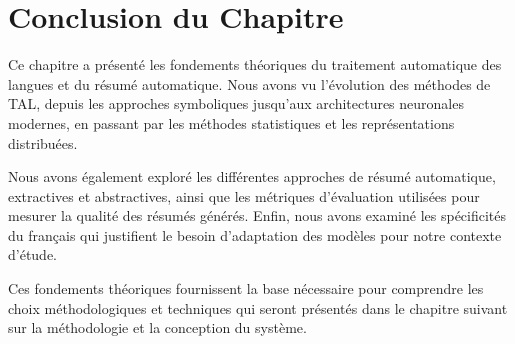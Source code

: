
\section{Conclusion du Chapitre}

Ce chapitre a présenté les fondements théoriques du traitement automatique des langues et du résumé automatique. Nous avons vu l'évolution des méthodes de TAL, depuis les approches symboliques jusqu'aux architectures neuronales modernes, en passant par les méthodes statistiques et les représentations distribuées.

Nous avons également exploré les différentes approches de résumé automatique, extractives et abstractives, ainsi que les métriques d'évaluation utilisées pour mesurer la qualité des résumés générés. Enfin, nous avons examiné les spécificités du français qui justifient le besoin d'adaptation des modèles pour notre contexte d'étude.

Ces fondements théoriques fournissent la base nécessaire pour comprendre les choix méthodologiques et techniques qui seront présentés dans le chapitre suivant sur la méthodologie et la conception du système.

